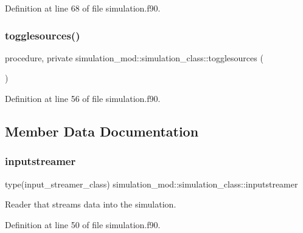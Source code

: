 Definition at line 68 of file simulation.\+f90.

\mbox{\label{structsimulation__mod_1_1simulation__class_a2394700a952ccf667b61d53764c73a54}} 
\subsubsection{\texorpdfstring{togglesources()}{togglesources()}}
{\footnotesize\ttfamily procedure, private simulation\+\_\+mod\+::simulation\+\_\+class\+::togglesources (\begin{DoxyParamCaption}{ }\end{DoxyParamCaption})\hspace{0.3cm}{\ttfamily [private]}}



Definition at line 56 of file simulation.\+f90.



\subsection{Member Data Documentation}
\mbox{\label{structsimulation__mod_1_1simulation__class_a40add8001e631510e3530931b9a9d06a}} 
\subsubsection{\texorpdfstring{inputstreamer}{inputstreamer}}
{\footnotesize\ttfamily type(input\+\_\+streamer\+\_\+class) simulation\+\_\+mod\+::simulation\+\_\+class\+::inputstreamer\hspace{0.3cm}{\ttfamily [private]}}



Reader that streams data into the simulation. 



Definition at line 50 of file simulation.\+f90.


